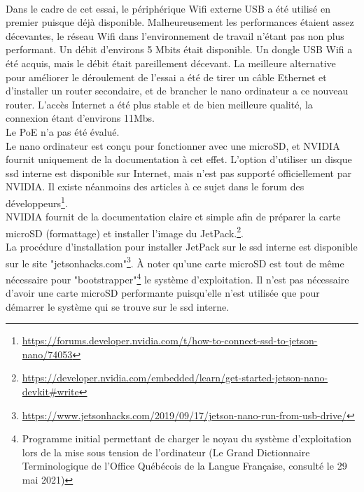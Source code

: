 \vspace{\baselineskip}
\\
\noindent Dans le cadre de cet essai, le périphérique Wifi externe USB a été utilisé en premier puisque déjà disponible. Malheureusement les performances étaient assez décevantes, le réseau Wifi dans l'environnement de travail n'étant pas non plus performant. Un débit d'environs 5 Mbits était disponible. Un dongle USB Wifi a été acquis, mais le débit était pareillement décevant. La meilleure alternative pour améliorer le déroulement de l'essai a été de tirer un câble Ethernet et d'installer un router secondaire, et de brancher le nano ordinateur a ce nouveau router. L'accès Internet a été plus stable et de bien meilleure qualité, la connexion étant d'environs 11Mbs. 
\vspace{\baselineskip}
\\
\noindent Le PoE n'a pas été évalué. 
\vspace{\baselineskip}
\\
Le nano ordinateur est conçu pour fonctionner avec une microSD, et NVIDIA fournit uniquement de la documentation à cet effet. L'option d'utiliser un disque \acrshort{ssd} interne est disponible sur Internet, mais n'est pas supporté officiellement par NVIDIA. Il existe néanmoins des articles à ce sujet dans le forum des développeurs\footnote{\url{https://forums.developer.nvidia.com/t/how-to-connect-ssd-to-jetson-nano/74053}}. 
\vspace{\baselineskip}
\\
\noindent NVIDIA fournit de la documentation claire et simple afin de préparer la carte microSD (formattage) et installer l'image du JetPack.\footnote{\url{https://developer.nvidia.com/embedded/learn/get-started-jetson-nano-devkit#write}}.
\vspace{\baselineskip}
\\
\noindent La procédure d'installation pour installer JetPack sur le \acrshort{ssd} interne est disponible sur le site "jetsonhacks.com"\footnote{\url{https://www.jetsonhacks.com/2019/09/17/jetson-nano-run-from-usb-drive/}}. À noter qu'une carte microSD est tout de même nécessaire pour "bootstrapper"\footnote{Programme initial permettant de charger le noyau du système d'exploitation lors de la mise sous tension de l'ordinateur (Le Grand Dictionnaire Terminologique de l'Office Québécois de la Langue Française, consulté le 29 mai 2021)} le système d'exploitation. Il n'est pas nécessaire d'avoir une carte microSD performante puisqu'elle n'est utilisée que pour démarrer le système qui se trouve sur le \acrshort{ssd} interne. 
